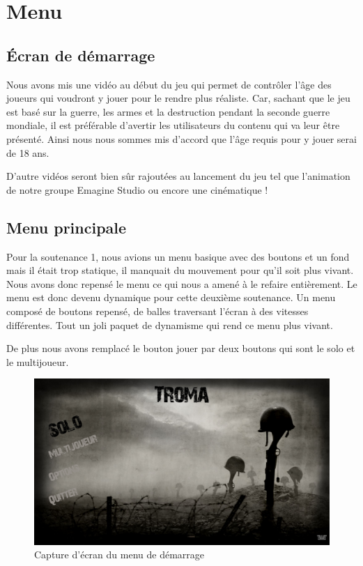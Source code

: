\documentclass[11pt]{report}
\begin{document}
\newpage
\section{Menu}

\subsection{Écran de démarrage}

Nous avons mis une vidéo au début du jeu qui permet de contrôler l’âge des joueurs qui voudront y jouer pour le rendre plus réaliste. Car, sachant que le jeu est basé sur la guerre, les armes et la destruction pendant la seconde guerre mondiale,  il est préférable d’avertir les utilisateurs du contenu qui va leur être présenté. Ainsi  nous nous sommes mis d’accord que l’âge requis pour y jouer serai de 18 ans.

D’autre vidéos seront bien sûr rajoutées au lancement du jeu tel que l’animation de notre groupe Emagine Studio ou encore une cinématique !

\subsection{Menu principale}

Pour la soutenance 1, nous avions un menu basique avec des boutons et un fond mais il était trop statique, il manquait du mouvement pour qu’il soit plus vivant. Nous avons donc repensé le menu ce qui nous a amené à le refaire entièrement. Le menu est donc devenu dynamique pour cette deuxième soutenance. Un menu composé de boutons repensé, de balles traversant l’écran à des vitesses différentes. Tout un joli paquet de dynamisme qui rend ce menu plus vivant.

De plus nous avons remplacé le bouton jouer par deux boutons qui sont le solo et le multijoueur. 

\begin{figure}[htbp]
\centering
\includegraphics[scale=0.13]{menu-start.png}
\caption{Capture d'écran du menu de démarrage}
\end{figure}
\end{document}
